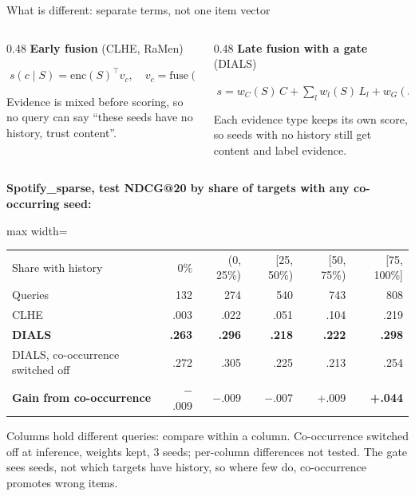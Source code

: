 \documentclass[10pt,aspectratio=169]{beamer}
\newcommand{\key}[1]{\textcolor{Accent}{\textbf{#1}}}
\newcommand{\fn}[1]{\textcolor{Muted}{\scriptsize #1}}
\begin{document}
\begin{frame}{What is different: separate terms, not one item vector}
\small
\begin{columns}[T,onlytextwidth]
\begin{column}{0.48\textwidth}
\key{Early fusion} (CLHE, RaMen)\par\vspace{1mm}
$\;s(c\mid S)=\mathrm{enc}(S)^\top v_c,\quad v_c=\mathrm{fuse}(\text{ID},\text{content},\text{graph})$\par
\vspace{1mm}
Evidence is mixed before scoring, so no query can say ``these seeds have no history, trust content''.
\end{column}
\begin{column}{0.48\textwidth}
\key{Late fusion with a gate} (DIALS)\par\vspace{1mm}
$\;s=w_C(S)\,C+\sum_l w_l(S)\,L_l+w_G(S)\,G$\par
\vspace{1mm}
Each evidence type keeps its own score, so seeds with no history still get content and label evidence.
\end{column}
\end{columns}
\vspace{2mm}
\textbf{Spotify\_sparse, test NDCG@20 by share of targets with any co-occurring seed:}\par\vspace{1mm}
\centering\renewcommand{\arraystretch}{1.05}
\begin{adjustbox}{max width=\textwidth}\begin{tabular}{lrrrrr}\toprule
Share with history & 0\% & (0, 25\%) & [25, 50\%) & [50, 75\%) & [75, 100\%]\\
Queries & 132 & 274 & 540 & 743 & 808\\\midrule
CLHE & .003 & .022 & .051 & .104 & .219\\
\key{DIALS} & \textbf{.263} & \textbf{.296} & \textbf{.218} & \textbf{.222} & \textbf{.298}\\
DIALS, co-occurrence switched off & .272 & .305 & .225 & .213 & .254\\
\key{Gain from co-occurrence} & $-$.009 & $-$.009 & $-$.007 & +.009 & \textbf{+.044}\\\bottomrule
\end{tabular}\end{adjustbox}\par
\raggedright\vspace{1mm}
\fn{Columns hold different queries: compare within a column. Co-occurrence switched off at inference, weights kept, 3 seeds; per-column differences not tested. The gate sees seeds, not which targets have history, so where few do, co-occurrence promotes wrong items.}
\end{frame}
\end{document}
